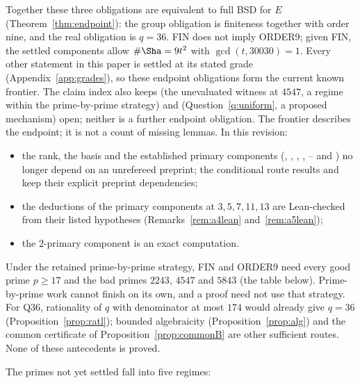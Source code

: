 Together these three obligations are equivalent to full BSD for $E$ (Theorem~\ref{thm:endpoint}): the group obligation is finiteness together with order nine, and the real obligation is $q=36$. FIN does not imply ORDER9; given FIN, the settled components allow $\#\Sha=9t^2$ with $\gcd(t,30030)=1$. Every other statement in this paper is settled at its stated grade (Appendix~\ref{app:grades}), so these endpoint obligations form the current known frontier. The claim index also keeps  (the unevaluated witness at $4547$, a regime within the prime-by-prime strategy) and  (Question~\ref{q:uniform}, a proposed mechanism) open; neither is a further endpoint obligation. The frontier describes the endpoint; it is not a count of missing lemmas. In this revision:
\begin{itemize}[leftmargin=*]
\item the rank, the basis and the established primary components (, , , , -- and ) no longer depend on an unrefereed preprint; the conditional route results  and  keep their explicit preprint dependencies;
\item the deductions of the primary components at $3,5,7,11,13$ are Lean-checked from their listed hypotheses (Remarks~\ref{rem:a4lean} and~\ref{rem:a5lean});
\item the $2$-primary component is an exact computation.
\end{itemize}
Under the retained prime-by-prime strategy, FIN and ORDER9 need every good prime $p\ge17$ and the bad primes $2243$, $4547$ and $5843$ (the table below). Prime-by-prime work cannot finish on its own, and a proof need not use that strategy. For Q36, rationality of $q$ with denominator at most $174$ would already give $q=36$ (Proposition~\ref{prop:ratl}); bounded algebraicity (Proposition~\ref{prop:alg}) and the common certificate of Proposition~\ref{prop:commonB} are other sufficient routes. None of these antecedents is proved.

The primes not yet settled fall into five regimes:


